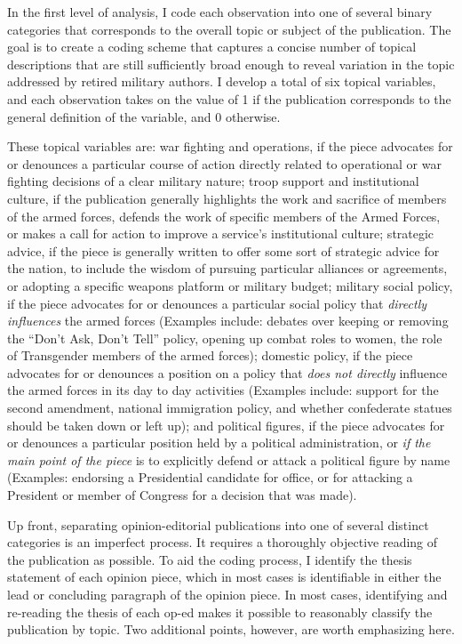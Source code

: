 \documentclass[12pt,]{article}
\begin{document}
In the first level of analysis, I code each observation into one of several binary categories that corresponds to the overall topic or subject of the publication. The goal is to create a coding scheme that captures a concise number of topical descriptions that are still sufficiently broad enough to reveal variation in the topic addressed by retired military authors. I develop a total of six topical variables, and each observation takes on the value of 1 if the publication corresponds to the general definition of the variable, and 0 otherwise.

These topical variables are: war fighting and operations, if the piece advocates for or denounces a particular course of action directly related to operational or war fighting decisions of a clear military nature; troop support and institutional culture, if the publication generally highlights the work and sacrifice of members of the armed forces, defends the work of specific members of the Armed Forces, or makes a call for action to improve a service's institutional culture; strategic advice, if the piece is generally written to offer some sort of strategic advice for the nation, to include the wisdom of pursuing particular alliances or agreements, or adopting a specific weapons platform or military budget; military social policy, if the piece advocates for or denounces a particular social policy that \emph{directly influences} the armed forces (Examples include: debates over keeping or removing the ``Don't Ask, Don't Tell'' policy, opening up combat roles to women, the role of Transgender members of the armed forces); domestic policy, if the piece advocates for or denounces a position on a policy that \emph{does not directly} influence the armed forces in its day to day activities (Examples include: support for the second amendment, national immigration policy, and whether confederate statues should be taken down or left up); and political figures, if the piece advocates for or denounces a particular position held by a political administration, or \emph{if the main point of the piece} is to explicitly defend or attack a political figure by name (Examples: endorsing a Presidential candidate for office, or for attacking a President or member of Congress for a decision that was made).

Up front, separating opinion-editorial publications into one of several distinct categories is an imperfect process. It requires a thoroughly objective reading of the publication as possible. To aid the coding process, I identify the thesis statement of each opinion piece, which in most cases is identifiable in either the lead or concluding paragraph of the opinion piece. In most cases, identifying and re-reading the thesis of each op-ed makes it possible to reasonably classify the publication by topic. Two additional points, however, are worth emphasizing here.
\end{document}
